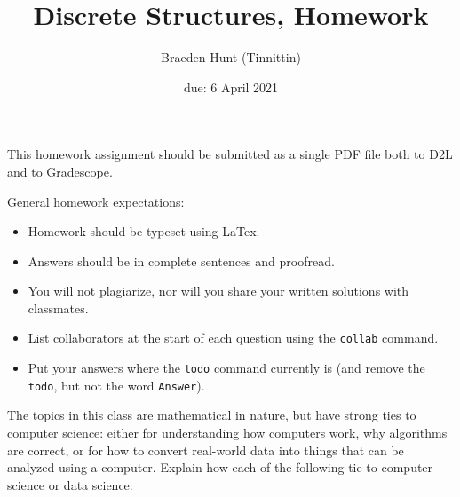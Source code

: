 \documentclass{article}
\title{Discrete Structures, Homework \hwnum}
\author{Braeden Hunt (Tinnittin)}
\date{due: 6 April 2021}
\begin{document}
\maketitle

This homework assignment should be
submitted as a single PDF file both to D2L and to Gradescope.

General homework expectations:
\begin{itemize}
    \item Homework should be typeset using LaTex.
    \item Answers should be in complete sentences and proofread.
    \item You will not plagiarize, nor will you share your written solutions
        with classmates.
    \item List collaborators at the start of each question using the \texttt{collab} command.
    \item Put your answers where the \texttt{todo} command currently is (and
        remove the \texttt{todo}, but not the word \texttt{Answer}).
\end{itemize}


 

The topics in this class are mathematical in nature, but have strong ties to
computer science: either for understanding how computers work, why algorithms are
correct, or for how to convert real-world data into things that can be analyzed
using a computer.  Explain how each of the following tie to computer science or
data science:
\end{document}
